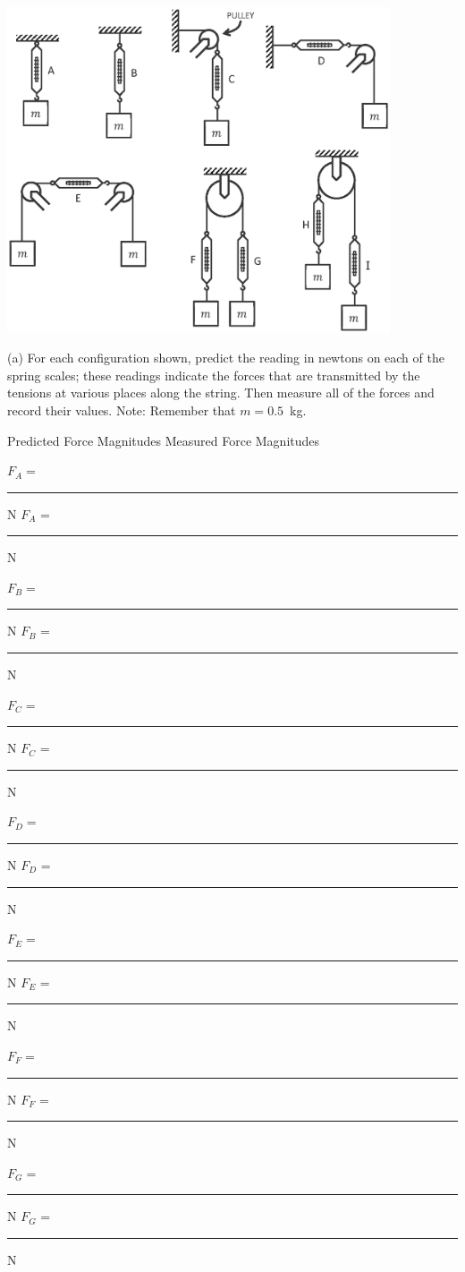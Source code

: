 {\par\centering \includegraphics[width=0.85\textwidth]{newton/newton_fig5_new.eps} \par}


(a) For each configuration shown, predict the reading in newtons on each
of the spring scales; these readings indicate the forces that are transmitted
by the tensions at various places along the string. Then measure all of the
forces and record their values. Note: Remember that $m = 0.5$~kg.

\answerspace{0.5cm}
\hfill{}Predicted Force Magnitudes \hfill{}Measured Force Magnitudes\hfill{}

\hfill{}$F_{A} = $ \rule{1.0in}{0.1pt} N \hfill{}$F_{A}$ = \rule{1.0in}{0.1pt} N\hfill{}

\hfill{}$F_{B} = $ \rule{1.0in}{0.1pt} N \hfill{}$F_{B}$ = \rule{1.0in}{0.1pt} N\hfill{}

\hfill{}$F_{C} = $ \rule{1.0in}{0.1pt} N \hfill{}$F_{C}$ = \rule{1.0in}{0.1pt} N\hfill{}

\hfill{}$F_{D} = $ \rule{1.0in}{0.1pt} N \hfill{}$F_{D}$ = \rule{1.0in}{0.1pt} N\hfill{}

\hfill{}$F_{E} = $ \rule{1.0in}{0.1pt} N \hfill{}$F_{E}$ = \rule{1.0in}{0.1pt} N\hfill{}

\hfill{}$F_{F} = $ \rule{1.0in}{0.1pt} N \hfill{}$F_{F}$ = \rule{1.0in}{0.1pt} N\hfill{}

\hfill{}$F_{G} = $ \rule{1.0in}{0.1pt} N \hfill{}$F_{G}$ = \rule{1.0in}{0.1pt} N\hfill{}

